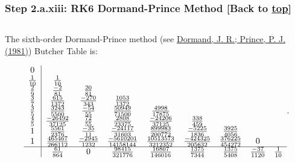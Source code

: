 \documentclass[landscape,letterpaper,10pt,english]{article}
\begin{document}
    \hypertarget{step-2.a.xiii-rk6-dormand-prince-method-back-to-top}{%
\subsubsection{\texorpdfstring{Step 2.a.xiii: RK6 Dormand-Prince Method
{[}Back to
\hyperref[toc]{top}{]}}{Step 2.a.xiii: RK6 Dormand-Prince Method {[}Back to {]}}}\label{step-2.a.xiii-rk6-dormand-prince-method-back-to-top}}

\[\label{dp6}\]

The sixth-order Dormand-Prince method (see
\href{https://www.sciencedirect.com/science/article/pii/0771050X81900103}{Dormand,
J. R.; Prince, P. J. (1981)}) Butcher Table is:

\[\begin{array}{c|cccccccc}
    0 & \\
    \frac{1}{10} & \frac{1}{10} & \\
    \frac{2}{9} & \frac{-2}{81} & \frac{20}{81} & \\
    \frac{3}{7} & \frac{615}{1372} & \frac{-270}{343} & \frac{1053}{1372} & \\
    \frac{3}{5} & \frac{3243}{5500} & \frac{-54}{55} & \frac{50949}{71500} & \frac{4998}{17875} & \\
    \frac{4}{5} & \frac{-26492}{37125} & \frac{72}{55} & \frac{2808}{23375} & \frac{-24206}{37125} & \frac{338}{459} & \\
    1 & \frac{5561}{2376} & \frac{-35}{11} & \frac{-24117}{31603} & \frac{899983}{200772} & \frac{-5225}{1836} & \frac{3925}{4056} & \\
    1 & \frac{465467}{266112} & \frac{-2945}{1232} & \frac{-5610201}{14158144} & \frac{10513573}{3212352} & \frac{-424325}{205632} & \frac{376225}{454272} &  0 & \\ \hline
     & \frac{61}{864} & 0 & \frac{98415}{321776} & \frac{16807}{146016} & \frac{1375}{7344} & \frac{1375}{5408} & \frac{-37}{1120} & \frac{1}{10}
\end{array}.\]
\end{document}
